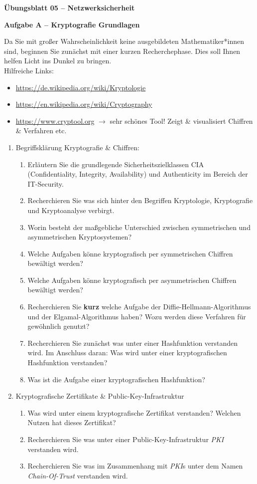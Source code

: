\documentclass[paper=a4,fontsize=11pt]{scrartcl}%
\begin{document}
\begin{center}
\Large{\textbf{Übungsblatt 05 -- Netzwerksicherheit}}
\end{center}

\begin{center}\Large{\textbf{Aufgabe A -- Kryptografie Grundlagen}}\end{center}
Da Sie mit großer Wahrscheinlichkeit keine ausgebildeten Mathematiker*innen sind, beginnen Sie zunächst mit einer kurzen Recherchephase. Dies soll Ihnen helfen Licht ins Dunkel zu bringen.\\
Hilfreiche Links:
\begin{itemize}
	\item \url{https://de.wikipedia.org/wiki/Kryptologie}
	\item \url{https://en.wikipedia.org/wiki/Cryptography}
	\item \url{https://www.cryptool.org} $\rightarrow$ sehr schönes Tool! Zeigt \& visualisiert Chiffren \& Verfahren etc.
\end{itemize}
\begin{enumerate}
	\item Begriffsklärung Kryptografie \& Chiffren:
	\begin{enumerate}
		\item Erläutern Sie die grundlegende Sicherheitszielklassen CIA (Confidentiality, Integrity, Availability) und Authenticity im Bereich der IT-Security.
		\item Recherchieren Sie was sich hinter den Begriffen Kryptologie, Kryptografie und Kryptoanalyse verbirgt.
		\item Worin besteht der maßgebliche Unterschied zwischen symmetrischen und asymmetrischen Kryptosystemen?
		\item Welche Aufgaben könne kryptografisch per symmetrischen Chiffren bewältigt werden?
		\item Welche Aufgaben könne kryptografisch per asymmetrischen Chiffren bewältigt werden?
		\item Recherchieren Sie \textbf{kurz} welche Aufgabe der Diffie-Hellmann-Algorithmus und der Elgamal-Algorithmus haben? Wozu werden diese Verfahren für gewöhnlich genutzt?
		\item Recherchieren Sie zunächst was unter einer Hashfunktion verstanden wird. Im Anschluss daran: Was wird unter einer kryptografischen Hashfunktion verstanden?
		\item  Was ist die Aufgabe einer kryptografischen Hashfunktion?
	\end{enumerate}
	\item Kryptografische Zertifikate \& Public-Key-Infrastruktur
	\begin{enumerate}
		\item Was wird unter einem kryptografische Zertifikat verstanden? Welchen Nutzen hat dieses Zertifikat?
		\item Recherchieren Sie was unter einer Public-Key-Infrastruktur \emph{PKI} verstanden wird.
		\item Recherchieren Sie was im Zusammenhang mit \emph{PKI}s unter dem Namen \emph{Chain-Of-Trust} verstanden wird.
	\end{enumerate}
\end{enumerate}
\end{document}
